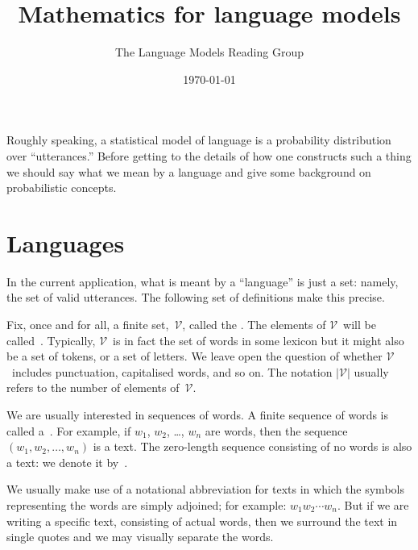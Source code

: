 \documentclass{article}
\title{Mathematics for language models}
\author{The Language Models Reading Group}
\date{\today}
\begin{document}
\newcommand{\isdef}{\stackrel{\text{def}}{=}}
\newcommand{\vocab}{\ensuremath{\mathcal{V}}}
\newcommand{\emptytext}{\ensuremath{\varepsilon}}
\newcommand{\lang}{\ensuremath{\mathcal{L}}}
\maketitle

Roughly speaking, a statistical model of language is a probability distribution over ``utterances.'' Before getting to the details of how one constructs such a thing we should say what we mean by a language and give some background on probabilistic concepts.

\section{Languages}

In the current application, what is meant by a ``language'' is just a set: namely, the set of valid utterances. The following set of definitions make this precise.

Fix, once and for all, a finite set,~\vocab, called the . The elements of \vocab\ will be called~. Typically, \vocab\ is in fact the set of words in some lexicon but it might also be a set of tokens, or a set of letters.  We leave open the question of whether \vocab\ includes punctuation, capitalised words, and so on.  The notation $\left|\vocab\right|$ usually refers to the number of elements of~\vocab.

We are usually interested in sequences of words. A finite sequence of words is called a~.  For example, if $w_1$, $w_2$, \dots, $w_n$ are words, then the sequence $(w_1, w_2, \dotsc, w_n)$ is a text.  The zero-length sequence consisting of no words is also a text: we denote it by~\defn[empty text, \emptytext]{\emptytext}. 

We usually make use of a notational abbreviation for texts in which the symbols representing the words are simply adjoined; for example: $w_1 w_2 \dotsb w_n$.  But if we are writing a specific text, consisting of actual words, then we surround the text in single quotes and we may visually separate the words.  
\end{document}
